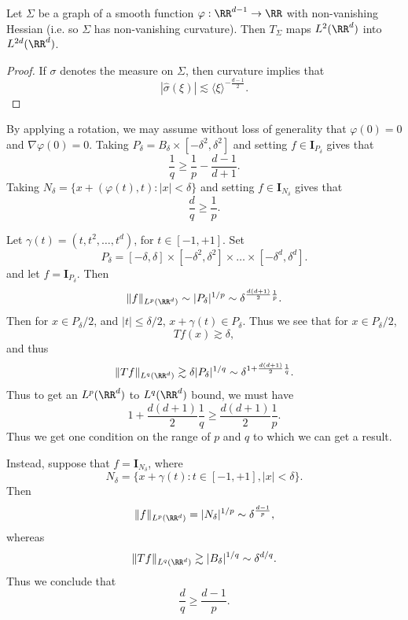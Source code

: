 \begin{theorem}
    Let $\Sigma$ be a graph of a smooth function $\varphi: \RR^{d-1} \to \RR$ with non-vanishing Hessian (i.e. so $\Sigma$ has non-vanishing curvature). Then $T_\Sigma$ maps $L^2(\RR^d)$ into $L^{2d}(\RR^d)$.
\end{theorem}
\begin{proof}
    If $\sigma$ denotes the measure on $\Sigma$, then curvature implies that
    \[ |\widehat{\sigma}(\xi)| \lesssim \langle \xi \rangle^{- \frac{d-1}{2}}. \]
\end{proof}

\begin{remark}
    By applying a rotation, we may assume without loss of generality that $\varphi(0) = 0$ and $\nabla \varphi(0) = 0$. Taking $P_\delta = B_\delta \times [-\delta^2, \delta^2]$ and setting $f \in \mathbf{I}_{P_\delta}$ gives that
    \[ \frac{1}{q} \geq \frac{1}{p} - \frac{d-1}{d+1}. \]
    Taking $N_\delta = \{ x + (\varphi(t),t) : |x| < \delta \}$ and setting $f \in \mathbf{I}_{N_\delta}$ gives that
    \[ \frac{d}{q} \geq \frac{1}{p}. \]
\end{remark}






\begin{example}
    Let $\gamma(t) = (t,t^2,\dots,t^d)$, for $t \in [-1,+1]$. Set
    \[ P_\delta = [-\delta,\delta] \times [-\delta^2,\delta^2] \times \dots \times [-\delta^d, \delta^d]. \]
    and let $f = \mathbf{I}_{P_\delta}$. Then
    \[ \| f \|_{L^p(\RR^d)} \sim |P_\delta|^{1/p} \sim \delta^{\frac{d(d+1)}{2} \frac{1}{p}}. \]
    Then for $x \in P_\delta / 2$, and $|t| \leq \delta / 2$, $x + \gamma(t) \in P_\delta$. Thus we see that for $x \in P_\delta / 2$,
    \[ Tf(x) \gtrsim \delta, \]
    and thus
    \[ \| Tf \|_{L^q(\RR^d)} \gtrsim \delta | P_\delta |^{1/q} \sim \delta^{1 + \frac{d(d+1)}{2} \frac{1}{q}}. \]
    Thus to get an $L^p(\RR^d)$ to $L^q(\RR^d)$ bound, we must have
    \[ 1 + \frac{d(d+1)}{2} \frac{1}{q} \geq \frac{d(d+1)}{2} \frac{1}{p}. \]
    Thus we get one condition on the range of $p$ and $q$ to which we can get a result.

    Instead, suppose that $f = \mathbf{I}_{N_\delta}$, where
    \[ N_\delta = \{ x + \gamma(t): t \in [-1,+1], |x| < \delta \}. \]
    Then
    \[ \| f \|_{L^p(\RR^d)} = |N_\delta|^{1/p} \sim \delta^{\frac{d-1}{p}}, \]
    whereas
    \[ \| Tf \|_{L^q(\RR^d)} \gtrsim |B_\delta|^{1/q} \sim \delta^{d/q}. \]
    Thus we conclude that
    \[ \frac{d}{q} \geq \frac{d-1}{p}. \]

\end{example}


